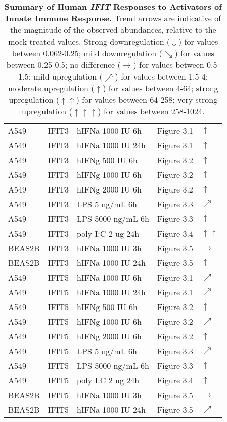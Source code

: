 \begin{table}
\begin{tabular}{lllll}
        A549 & IFIT3 & hIFNa 1000 IU 6h & Figure 3.1 & \(\uparrow\) \\ 
        A549 & IFIT3 & hIFNa 1000 IU 24h & Figure 3.1 & \(\uparrow\) \\ 
        A549 & IFIT3 & hIFNg 500 IU 6h & Figure 3.2 & \(\uparrow\) \\ 
        A549 & IFIT3 & hIFNg 1000 IU 6h & Figure 3.2 & \(\uparrow\) \\ 
        A549 & IFIT3 & hIFNg 2000 IU 6h & Figure 3.2 & \(\uparrow\) \\ 
        A549 & IFIT3 & LPS 5 ng/mL 6h & Figure 3.3 & \(\nearrow\) \\ 
        A549 & IFIT3 & LPS 5000 ng/mL 6h & Figure 3.3 & \(\uparrow\) \\ 
        A549 & IFIT3 & poly I:C 2 ug 24h & Figure 3.4 & \(\uparrow\)\(\uparrow\) \\ 
        BEAS2B & IFIT3 & hIFNa 1000 IU 3h & Figure 3.5 & \(\rightarrow\) \\ 
        BEAS2B & IFIT3 & hIFNa 1000 IU 24h & Figure 3.5 & \(\uparrow\) \\ 
        A549 & IFIT5 & hIFNa 1000 IU 6h & Figure 3.1 & \(\nearrow\) \\ 
        A549 & IFIT5 & hIFNa 1000 IU 24h & Figure 3.1 & \(\nearrow\) \\ 
        A549 & IFIT5 & hIFNg 500 IU 6h & Figure 3.2 & \(\uparrow\) \\ 
        A549 & IFIT5 & hIFNg 1000 IU 6h & Figure 3.2 & \(\nearrow\) \\ 
        A549 & IFIT5 & hIFNg 2000 IU 6h & Figure 3.2 & \(\uparrow\) \\ 
        A549 & IFIT5 & LPS 5 ng/mL 6h & Figure 3.3 & \(\nearrow\) \\ 
        A549 & IFIT5 & LPS 5000 ng/mL 6h & Figure 3.3 & \(\uparrow\) \\ 
        A549 & IFIT5 & poly I:C 2 ug 24h & Figure 3.4 & \(\uparrow\) \\ 
        BEAS2B & IFIT5 & hIFNa 1000 IU 3h & Figure 3.5 & \(\rightarrow\) \\ 
        BEAS2B & IFIT5 & hIFNa 1000 IU 24h & Figure 3.5 & \(\nearrow\) \\ \hline
    \end{tabular}
    \caption[Summary of Human \textit{IFIT} Responses to Activators of Innate Immune Response.]{\textbf{Summary of Human \textit{IFIT} Responses to Activators of Innate Immune Response.} Trend arrows are indicative of the magnitude of the observed abundances, relative to the mock-treated values. Strong downregulation ($\downarrow$) for values between 0.062-0.25; mild downregulation ($\searrow$) for values between 0.25-0.5; no difference ($\rightarrow$) for values between 0.5-1.5; mild upregulation ($\nearrow$) for values between 1.5-4; moderate upregulation ($\uparrow$) for values between 4-64; strong upregulation ($\uparrow$$\uparrow$) for values between 64-258; very strong upregulation ($\uparrow$$\uparrow$$\uparrow$) for values between 258-1024.}
    \label{tab:Summary of Human IFIT Responses to Activators of Innate Immune Response.}
\end{table}


